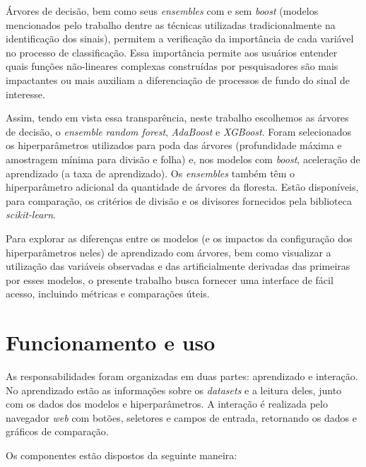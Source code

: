 \documentclass[12pt]{article}
\begin{document}
Árvores de decisão, bem como seus \textit{ensembles} com e sem \textit{boost} (modelos mencionados pelo trabalho dentre as técnicas utilizadas tradicionalmente na identificação dos sinais), permitem a verificação da importância de cada variável no processo de classificação.
Essa importância permite aos usuários entender quais funções não-lineares complexas construídas por pesquisadores são mais impactantes ou mais auxiliam a diferenciação de processos de fundo do sinal de interesse.  

Assim, tendo em vista essa transparência, neste trabalho escolhemos as árvores de decisão, o \textit{ensemble} \textit{random forest}, \textit{AdaBoost} e \textit{XGBoost}.
Foram selecionados os hiperparâmetros utilizados para poda das árvores (profundidade máxima e amostragem mínima para divisão e folha) e, nos modelos com \textit{boost}, aceleração de aprendizado (a taxa de aprendizado).
Os \textit{ensembles} também têm o hiperparâmetro adicional da quantidade de árvores da floresta.
Estão disponíveis, para comparação, os critérios de divisão e os divisores fornecidos pela biblioteca \textit{scikit-learn}.

Para explorar as diferenças entre os modelos (e os impactos da configuração dos hiperparâmetros neles) de aprendizado com árvores, bem como visualizar a utilização das variáveis observadas e das artificialmente derivadas das primeiras por esses modelos, o presente trabalho busca fornecer uma interface de fácil acesso, incluindo métricas e comparações úteis.


\section{Funcionamento e uso}

As responsabilidades foram organizadas em duas partes: aprendizado e interação.
No aprendizado estão as informações sobre os \textit{datasets} e a leitura deles, junto com os dados dos modelos e hiperparâmetros.
A interação é realizada pelo navegador \textit{web} com botões, seletores e campos de entrada, retornando os dados e gráficos de comparação.

Os componentes estão dispostos da seguinte maneira:
\end{document}

